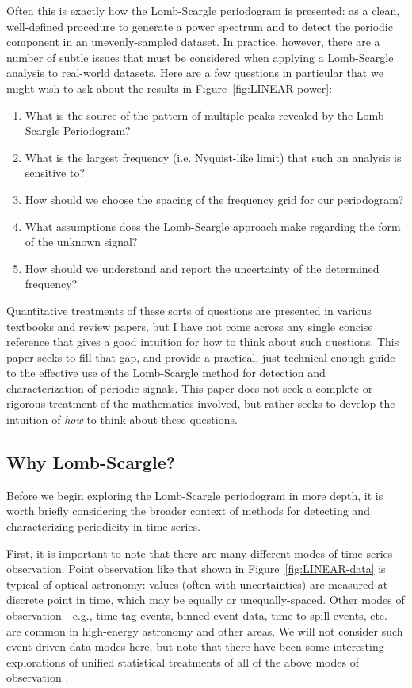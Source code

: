 \documentclass[preprint]{aastex}
\newcommand{\fig}[1]{Figure~\ref{fig:#1}}
\newcommand{\sectlabel}[1]{\label{sect:#1}}
\begin{document}
Often this is exactly how the Lomb-Scargle periodogram is presented: as a
clean, well-defined procedure to generate a power spectrum and to
detect the periodic component in an unevenly-sampled dataset.
In practice, however, there are a number of subtle issues that must be
considered when applying a Lomb-Scargle analysis to real-world datasets.
Here are a few questions in particular that we might wish to ask about
the results in \fig{LINEAR-power}:
\begin{enumerate}
  \item What is the source of the pattern of multiple peaks revealed by the
    Lomb-Scargle Periodogram?
  \item What is the largest frequency (i.e. Nyquist-like limit) that such
    an analysis is sensitive to?
  \item How should we choose the spacing of the frequency grid for our
    periodogram?
  \item What assumptions does the Lomb-Scargle approach make regarding the
    form of the unknown signal?
  \item How should we understand and report the uncertainty of the
    determined frequency?
\end{enumerate}
Quantitative treatments of these sorts of questions are presented in various
textbooks and review papers, but I have not come across any single concise
reference that gives a good intuition for how to think about such questions.
This paper seeks to fill that gap, and provide a practical,
just-technical-enough guide to the effective use of the Lomb-Scargle method
for detection and characterization of periodic signals.
This paper does not seek a complete or rigorous treatment of the mathematics
involved, but rather seeks to develop the intuition of {\it how} to think
about these questions.

\subsection{Why Lomb-Scargle?}
\sectlabel{why-lomb-scargle}

Before we begin exploring the Lomb-Scargle periodogram in more depth,
it is worth briefly considering the broader context of methods for
detecting and characterizing periodicity in time series.

First, it is important to note that there are many different modes of
time series observation.
Point observation like that shown in \fig{LINEAR-data} is typical of
optical astronomy: values (often with uncertainties) are measured at
discrete point in time, which may be equally or unequally-spaced.
Other modes of observation---e.g., time-tag-events, binned event data,
time-to-spill events, etc.---are common in high-energy astronomy and other
areas. We will not consider such event-driven data modes here, but note
that there have been some interesting explorations of unified statistical
treatments of all of the above modes of observation
\citep[e.g.][]{Scargle98, Scargle2002}.
\end{document}
